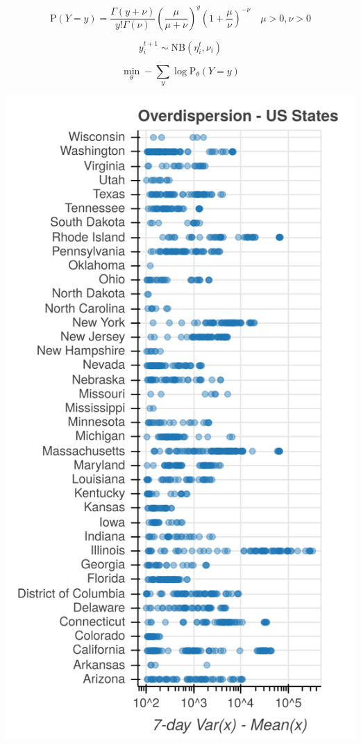 \documentclass{article}
\renewcommand{\Pr}{\text{P}}
\begin{document}
\begin{equation*}
\Pr(Y = y) = \frac{\Gamma(y + \nu)}{y!\Gamma(\nu)}\left(\frac{\mu}{\mu +\nu}\right)^{y}\left(1 + \frac{\mu}{\nu}\right)^{-\nu}
\quad \mu > 0, \nu > 0
\end{equation*}

\begin{equation*}
    y^{t+1}_{i} \sim \text{NB}(\eta_i^{t}, \nu_i)
\end{equation*}

\begin{equation*}
    \min_\theta -\sum_{y} \log \Pr_\theta(Y = y)
\end{equation*}

\begin{minipage}{.335\linewidth}
\begin{center}
\includegraphics[width=\columnwidth]{img/overdispersion_states.png}
\end{center}
\end{minipage}
\end{document}

